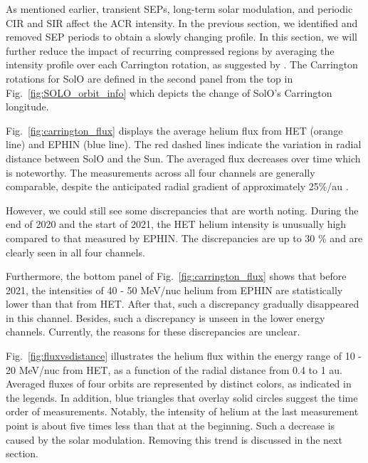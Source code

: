 As mentioned earlier, transient \acp{SEP}, long-term solar modulation, and periodic \ac{CIR} and \acs{SIR} affect the \ac{ACR} intensity. In the previous section, we identified and removed \ac{SEP} periods to obtain a slowly changing profile. In this section, we will further reduce the impact of recurring compressed regions by averaging the intensity profile over each Carrington rotation, as suggested by \citet{Rankin2021ApJ}. The Carrington rotations for \ac{SolO} are defined in the second panel from the top in Fig.~\ref{fig:SOLO_orbit_info} which depicts the change of \ac{SolO}'s Carrington longitude. 


Fig.~\ref{fig:carrington_flux} displays the average helium flux from \ac{HET} (orange line) and \ac{EPHIN} (blue line). The red dashed lines indicate the variation in radial distance between \ac{SolO} and the Sun. The averaged flux decreases over time which is noteworthy. The measurements across all four channels are generally comparable, despite the anticipated radial gradient of approximately 25\%/au \citep{Rankin2021ApJ}.

However, we could still see some discrepancies that are worth noting. During the end of 2020 and the start of 2021, the \ac{HET} helium intensity is unusually high compared to that measured by \ac{EPHIN}. The discrepancies are up to 30 \% and are clearly seen in all four channels.

Furthermore, the bottom panel of Fig.~\ref{fig:carrington_flux} shows that before 2021, the intensities of 40 - 50 MeV/nuc helium from \ac{EPHIN} are statistically lower than that from \ac{HET}. After that, such a discrepancy gradually disappeared in this channel. Besides, such a discrepancy is unseen in the lower energy channels. Currently, the reasons for these discrepancies are unclear.

Fig.~\ref{fig:fluxvsdistance} illustrates the helium flux within the energy range of 10 - 20 MeV/nuc from \ac{HET}, as a function of the radial distance from 0.4 to 1 au. Averaged fluxes of four orbits are represented by distinct colors, as indicated in the legends. In addition, blue triangles that overlay solid circles suggest the time order of measurements. Notably, the intensity of helium at the last measurement point is about five times less than that at the beginning. Such a decrease is caused by the solar modulation. Removing this trend is discussed in the next section.

